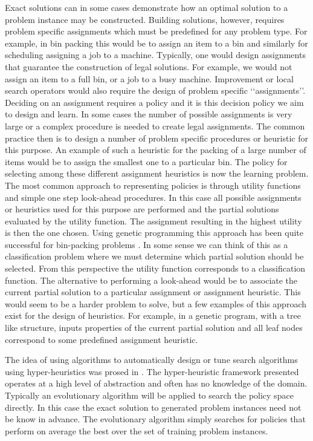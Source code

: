 \documentclass[12pt,a4paper]{article}
\begin{document}
Exact solutions can in some cases demonstrate how an optimal solution to a problem instance may be constructed. 
Building solutions, however, requires problem specific assignments which must be predefined for any problem type. For 
example, in bin packing this would be to assign an item to a bin and similarly for scheduling assigning a job to a 
machine. Typically, one would design assignments that guarantee the construction of legal solutions. For example, we 
would not assign an item to a full bin, or a job to a busy machine. Improvement or local search operators would 
also require the design of problem specific \lq\lq assignments\rq\rq. Deciding on an assignment requires a policy and 
it is this decision policy we aim to design and learn. In some cases the number of possible assignments is very large 
or a complex procedure is needed to create legal assignments. The common practice then is to design a number of 
problem specific procedures or heuristic for this purpose. An example of such a heuristic for the packing of a large 
number of items would be to assign the smallest one to a particular bin. The policy for selecting among these 
different assignment heuristics is now the learning problem. The most common approach to representing policies is 
through utility functions and simple one step look-ahead procedures. In this case all possible assignments or 
heuristics used for this purpose are performed and the partial solutions evaluated by the utility function. The 
assignment resulting in the highest utility is then the one chosen.  Using genetic programming this approach has been 
quite successful for bin-packing problems \cite{poli2007histogram,burke2012automating}. In some sense we can think of 
this as a classification problem where we must determine which partial solution should be selected. From this 
perspective the utility function corresponds to a classification function. The alternative to performing a look-ahead 
would be to associate the current partial solution to a particular assignment or assignment heuristic. This would seem 
to be a harder problem to solve, but a few examples of this approach exist for the design of heuristics. For example, 
in \cite{fukunaga2008automated,bader2009evolving} a genetic program, with a tree like structure, inputs properties of 
the current partial solution and all leaf nodes correspond to some predefined assignment heuristic. 

The idea of using algorithms to automatically design or tune search algorithms using hyper-heuristics was prosed in   
\cite{burke2003hyper}. The hyper-heuristic framework presented operates at a high level of abstraction and often has 
no knowledge of the domain. Typically an evolutionary algorithm will be applied to search the policy space directly. 
In this case the exact solution to generated problem instances need not be know in advance. The evolutionary 
algorithm simply searches for policies that perform on average the best over the set of training problem instances.
\end{document}
